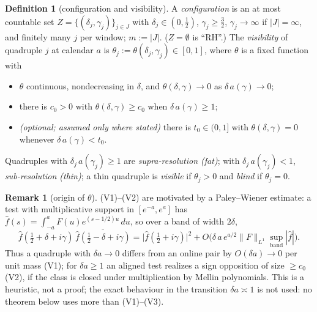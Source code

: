 \documentclass[11pt,reqno]{amsart}
\theoremstyle{definition}
\newtheorem{definition}[theorem]{Definition}
\newtheorem{remark}[theorem]{Remark}
\newcommand{\half}{\tfrac12}
\begin{document}
\begin{definition}[configuration and visibility]\label{def:config}
A \emph{configuration} is an at most countable set
\(Z=\{(\delta_j,\gamma_j)\}_{j\in J}\) with \(\delta_j\in(0,\half)\), \(\gamma_j\geq\tfrac32\),
\(\gamma_j\to\infty\) if \(|J|=\infty\), and finitely many \(j\) per window;
\(m:=|J|\). (\(Z=\emptyset\) is ``RH''.) The \emph{visibility} of quadruple
\(j\) at calendar \(a\) is \(\theta_j:=\theta(\delta_j,\gamma_j)\in[0,1]\),
where \(\theta\) is a fixed function with
\begin{itemize}
\item[\textup{(V1)}] \(\theta\) continuous, nondecreasing in \(\delta\), and
\(\theta(\delta,\gamma)\to0\) as \(\delta\,a(\gamma)\to0\);
\item[\textup{(V2)}] there is \(c_0>0\) with \(\theta(\delta,\gamma)\geq c_0\)
when \(\delta\,a(\gamma)\geq1\);
\item[\textup{(V3)}] \emph{(optional; assumed only where stated)} there is
\(t_0\in(0,1]\) with \(\theta(\delta,\gamma)=0\) whenever
\(\delta\,a(\gamma)<t_0\).
\end{itemize}
Quadruples with \(\delta_j\,a(\gamma_j)\geq1\) are \emph{supra-resolution (fat)};
with \(\delta_j\,a(\gamma_j)<1\), \emph{sub-resolution (thin)}; a thin quadruple
is \emph{visible} if \(\theta_j>0\) and \emph{blind} if \(\theta_j=0\).
\end{definition}

\begin{remark}[origin of \(\theta\)]\label{rem:theta}
(V1)--(V2) are motivated by a Paley--Wiener estimate: a
test with multiplicative support in \([e^{-a},e^a]\) has
\(\hat f(s)=\int_{-a}^{a}F(u)e^{(s-1/2)u}\,du\), so over a band of width
\(2\delta\),
\[
\hat f(\tfrac12+\delta+i\gamma)\,\overline{\hat f(\tfrac12-\delta+i\gamma)}
=\bigl|\hat f(\tfrac12+i\gamma)\bigr|^2
+O\bigl(\delta\,a\,e^{a/2}\|F\|_{L^1}\sup_{\text{band}}|\hat f|\bigr).
\]
Thus a quadruple with \(\delta a\to0\) differs from an online pair by
\(O(\delta a)\to0\) per unit mass (V1); for \(\delta a\geq1\) an aligned test
realizes a sign opposition of size \(\geq c_0\) (V2), if the class is closed
under multiplication by Mellin polynomials. This is a heuristic, not a proof;
the exact behaviour in the transition \(\delta a\asymp1\) is not used: no
theorem below uses more than (V1)--(V3).
\end{remark}
\end{document}
